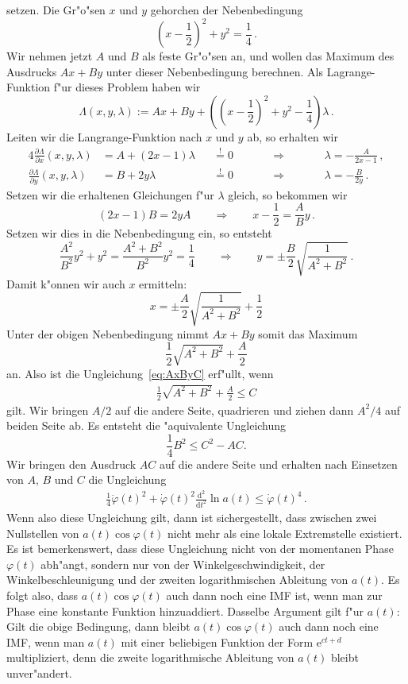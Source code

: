 \documentclass[a4paper]{scrartcl}
\newcommand{\de}{{\mathrm{d}}}
\newcommand{\ee}{{\mathrm{e}}}
\newcommand{\pphi}{{\varphi}}
\newcommand{\defeq}{\overset{!}{=}}
\begin{document}
setzen. Die Gr"o"sen $x$ und $y$ gehorchen der Nebenbedingung
$$ \left(x-\frac12\right)^2 + y^2 = \frac14\,. $$
Wir nehmen jetzt $A$ und $B$ als feste Gr"o"sen an, und wollen das Maximum des Ausdrucks $Ax+By$ unter dieser Nebenbedingung berechnen. 
Als Lagrange-Funktion f"ur dieses Problem haben wir
$$ \Lambda(x,y,\lambda) 
:= Ax + By + \left( \left(x-\frac12\right)^2 + y^2 - \frac14 \right) \lambda \,. $$
Leiten wir die Langrange-Funktion nach $x$ und $y$ ab, so erhalten wir
\begin{alignat*}{4}
  \frac{\partial\Lambda}{\partial x}(x,y,\lambda) &= A + (2x-1)\lambda &&\defeq 0 
  &\qquad&\Longrightarrow &\qquad& \lambda = -\frac{A}{2x-1}\,, \\
  \frac{\partial\Lambda}{\partial y}(x,y,\lambda) &= B +  2y   \lambda &&\defeq 0 
  && \Longrightarrow && \lambda = -\frac{B}{2y}\,.
\end{alignat*}
Setzen wir die erhaltenen Gleichungen f"ur $\lambda$ gleich, so bekommen wir 
$$ (2x-1)B = 2yA \qquad \Longrightarrow \qquad
x-\frac12 = \frac AB y\,. $$
Setzen wir dies in die Nebenbedingung ein, so entsteht
$$ \frac{A^2}{B^2}y^2 + y^2 = \frac{A^2+B^2}{B^2}y^2 
= \frac14 \qquad \Longrightarrow \qquad
y=\pm\frac B2\sqrt{\frac{1}{A^2+B^2}}\,. $$
Damit k"onnen wir auch $x$ ermitteln:
$$ x = \pm\frac A2\sqrt{\frac{1}{A^2+B^2}} + \frac12 $$
Unter der obigen Nebenbedingung nimmt $Ax+By$ somit das Maximum
$$ \frac12 \sqrt{A^2+B^2}+\frac A2 $$
an. Also ist die Ungleichung~\eqref{eq:AxByC} erf"ullt, wenn 
\begin{align} \label{eq:intermediateABC}
  \frac12\sqrt{A^2+B^2}+\frac A2 \le C 
\end{align}
gilt. Wir bringen $A/2$ auf die andere Seite, quadrieren und ziehen dann $A^2/4$ auf beiden Seite ab. 
Es entsteht die "aquivalente Ungleichung
$$ \frac14 B^2 \le C^2 - AC. $$
Wir bringen den Ausdruck $AC$ auf die andere Seite und erhalten nach Einsetzen von $A$, $B$ und $C$ die Ungleichung
\begin{align} \label{eq:condpphiiai}
  \frac14\ddot\pphi(t)^2 + \dot\pphi(t)^2\frac{\de^2}{\de t^2}\ln a(t) 
  \le \dot\pphi(t)^4\,.
\end{align}
Wenn also diese Ungleichung gilt, dann ist sichergestellt, dass zwischen zwei Nullstellen von $a(t)\cos\pphi(t)$ nicht mehr als eine lokale Extremstelle existiert. 
Es ist bemerkenswert, dass diese Ungleichung nicht von der momentanen Phase $\pphi(t)$ abh"angt, sondern nur von der Winkelgeschwindigkeit, der Winkelbeschleunigung und der zweiten logarithmischen Ableitung von $a(t)$. 
Es folgt also, dass $a(t)\cos\pphi(t)$ auch dann noch eine IMF ist, wenn man zur Phase eine konstante Funktion hinzuaddiert. 
Dasselbe Argument gilt f"ur $a(t)$: Gilt die obige Bedingung, dann bleibt $a(t)\cos\pphi(t)$ auch dann noch eine IMF, wenn man  $a(t)$ mit einer beliebigen Funktion der Form $\ee^{ct+d}$ multipliziert, denn die zweite logarithmische Ableitung von $a(t)$ bleibt unver"andert. 
\end{document}
